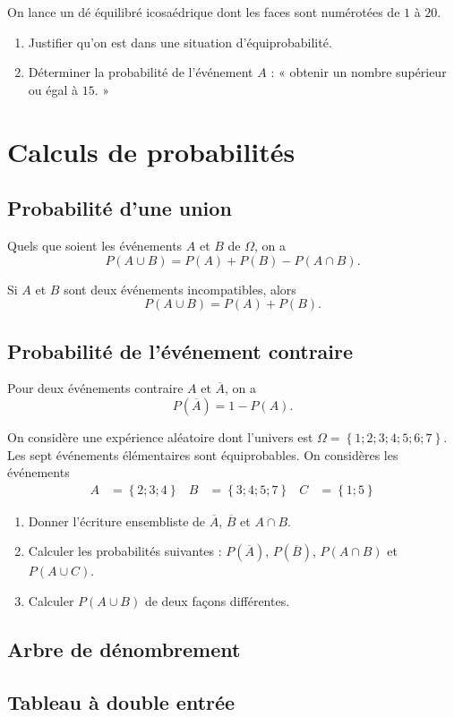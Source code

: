\documentclass[11pt]{article}
\begin{document}
\begin{app}
  On lance un dé équilibré icosaédrique dont les faces sont numérotées de $1$ à
  $20$.
  \begin{enumerate}
    \item Justifier qu'on est dans une situation d'équiprobabilité.
    \item Déterminer la probabilité de l'événement $A$ : « obtenir un nombre
      supérieur ou égal à $15$. »
  \end{enumerate}
\end{app}

\section{Calculs de probabilités}
\subsection{Probabilité d'une union}

\begin{prop}
  Quels que soient les événements $A$ et $B$ de $\Omega$, on a
  \[
    P\left( A \cup B \right) = P\left( A \right) + P\left( B \right) - P\left(
    A\cap B \right).
  \]
\end{prop}

\begin{prop}
  Si $A$ et $B$ sont deux événements incompatibles, alors
  \[
    P\left( A \cup B \right) = P\left( A \right) + P\left( B \right).
  \]
\end{prop}

\subsection{Probabilité de l'événement contraire}

\begin{prop}
  Pour deux événements contraire $A$ et $\overline A$, on a
  \[
    P\left( \overline A \right) = 1 - P\left( A \right).
  \]
\end{prop}

\begin{app}
  On considère une expérience aléatoire dont l'univers est $\Omega = \left\{
  1; 2; 3; 4; 5; 6; 7 \right\}$. Les sept événements élémentaires sont
  équiprobables. On considères les événements
\begin{align*}
  A &= \left\{ 2; 3; 4 \right\} &
  B &= \left\{3; 4; 5; 7 \right\} &
  C &= \left\{1; 5 \right\}
\end{align*}
\begin{enumerate}
  \item Donner l'écriture ensembliste de $\overline A$, $\overline B$ et $A\cap
    B$.
  \item Calculer les probabilités suivantes : $P\left( \overline A \right)$,
    $P\left( \overline B \right)$, $P(A\cap B)$ et $P(A\cup C)$.
  \item Calculer $P\left( A\cup B \right)$ de deux façons différentes.
\end{enumerate}
\end{app}

\subsection{Arbre de dénombrement}
\subsection{Tableau à double entrée}
\end{document}
